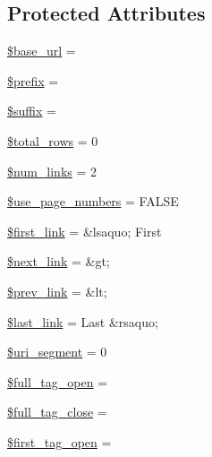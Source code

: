 \subsection*{Protected Attributes}
\begin{DoxyCompactItemize}
\item 
\mbox{\hyperlink{class_c_i___pagination_a6886427c9c643f707fcb35c018049bc7}{\$base\+\_\+url}} = \textquotesingle{}\textquotesingle{}
\item 
\mbox{\hyperlink{class_c_i___pagination_a09e8cf95b9d29955a0bfabca9b420edc}{\$prefix}} = \textquotesingle{}\textquotesingle{}
\item 
\mbox{\hyperlink{class_c_i___pagination_a8a4ee1ac7ecdf8ef590598ad43b23e0a}{\$suffix}} = \textquotesingle{}\textquotesingle{}
\item 
\mbox{\hyperlink{class_c_i___pagination_af2c641e024ee7eeec68ae26c08ca2cf2}{\$total\+\_\+rows}} = 0
\item 
\mbox{\hyperlink{class_c_i___pagination_aa04c33b46d7b63638408ac57ca3ee9e9}{\$num\+\_\+links}} = 2
\item 
\mbox{\hyperlink{class_c_i___pagination_ac19b7d290389a9188ca6466f85d14a85}{\$use\+\_\+page\+\_\+numbers}} = F\+A\+L\+SE
\item 
\mbox{\hyperlink{class_c_i___pagination_a0236d9345031b8c11db487560609f9a7}{\$first\+\_\+link}} = \textquotesingle{}\&lsaquo; First\textquotesingle{}
\item 
\mbox{\hyperlink{class_c_i___pagination_ae3962413e69384df902aedf7484ddefe}{\$next\+\_\+link}} = \textquotesingle{}\&gt;\textquotesingle{}
\item 
\mbox{\hyperlink{class_c_i___pagination_afab5c29a3da82c4dce6a491f1d257831}{\$prev\+\_\+link}} = \textquotesingle{}\&lt;\textquotesingle{}
\item 
\mbox{\hyperlink{class_c_i___pagination_ab10d1c6de63d2bc11a210c26e450b231}{\$last\+\_\+link}} = \textquotesingle{}Last \&rsaquo;\textquotesingle{}
\item 
\mbox{\hyperlink{class_c_i___pagination_a79fd9718cc6c432f6919c28299584d77}{\$uri\+\_\+segment}} = 0
\item 
\mbox{\hyperlink{class_c_i___pagination_a75336a53727415578f78bd3d337c8559}{\$full\+\_\+tag\+\_\+open}} = \textquotesingle{}\textquotesingle{}
\item 
\mbox{\hyperlink{class_c_i___pagination_ad7e8fd7ace07539860b6f0b323aacbc8}{\$full\+\_\+tag\+\_\+close}} = \textquotesingle{}\textquotesingle{}
\item 
\mbox{\hyperlink{class_c_i___pagination_a5e352cfb5a6e9b6f850264aca68f00e0}{\$first\+\_\+tag\+\_\+open}} = \textquotesingle{}\textquotesingle{}

\end{DoxyCompactItemize}
